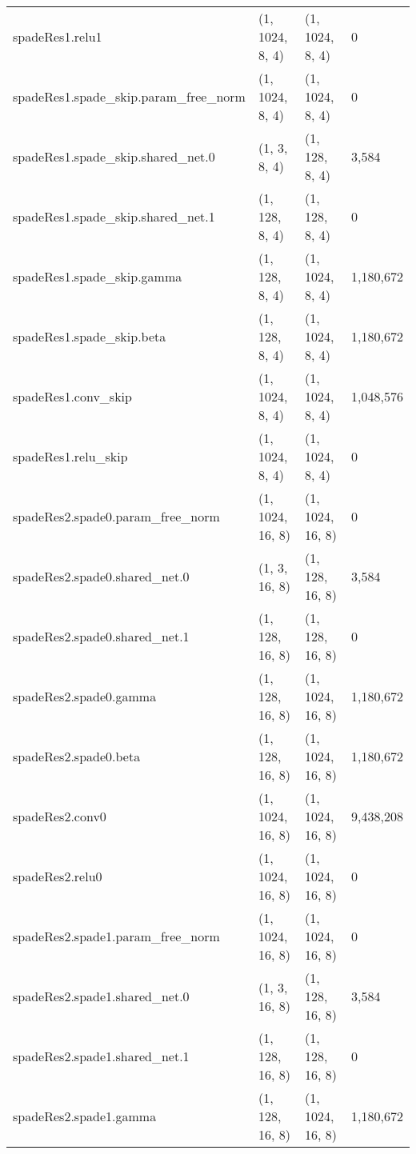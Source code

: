 \begin{longtable}{llll}
                        spadeRes1.relu1 &     (1, 1024, 8, 4) &     (1, 1024, 8, 4) &            0 \\
    spadeRes1.spade\_skip.param\_free\_norm &     (1, 1024, 8, 4) &     (1, 1024, 8, 4) &            0 \\
        spadeRes1.spade\_skip.shared\_net.0 &        (1, 3, 8, 4) &      (1, 128, 8, 4) &        3,584 \\
        spadeRes1.spade\_skip.shared\_net.1 &      (1, 128, 8, 4) &      (1, 128, 8, 4) &            0 \\
            spadeRes1.spade\_skip.gamma &      (1, 128, 8, 4) &     (1, 1024, 8, 4) &    1,180,672 \\
                spadeRes1.spade\_skip.beta &      (1, 128, 8, 4) &     (1, 1024, 8, 4) &    1,180,672 \\
                    spadeRes1.conv\_skip &     (1, 1024, 8, 4) &     (1, 1024, 8, 4) &    1,048,576 \\
                    spadeRes1.relu\_skip &     (1, 1024, 8, 4) &     (1, 1024, 8, 4) &            0 \\
        spadeRes2.spade0.param\_free\_norm &    (1, 1024, 16, 8) &    (1, 1024, 16, 8) &            0 \\
            spadeRes2.spade0.shared\_net.0 &       (1, 3, 16, 8) &     (1, 128, 16, 8) &        3,584 \\
            spadeRes2.spade0.shared\_net.1 &     (1, 128, 16, 8) &     (1, 128, 16, 8) &            0 \\
                spadeRes2.spade0.gamma &     (1, 128, 16, 8) &    (1, 1024, 16, 8) &    1,180,672 \\
                    spadeRes2.spade0.beta &     (1, 128, 16, 8) &    (1, 1024, 16, 8) &    1,180,672 \\
                        spadeRes2.conv0 &    (1, 1024, 16, 8) &    (1, 1024, 16, 8) &    9,438,208 \\
                        spadeRes2.relu0 &    (1, 1024, 16, 8) &    (1, 1024, 16, 8) &            0 \\
        spadeRes2.spade1.param\_free\_norm &    (1, 1024, 16, 8) &    (1, 1024, 16, 8) &            0 \\
            spadeRes2.spade1.shared\_net.0 &       (1, 3, 16, 8) &     (1, 128, 16, 8) &        3,584 \\
            spadeRes2.spade1.shared\_net.1 &     (1, 128, 16, 8) &     (1, 128, 16, 8) &            0 \\
                spadeRes2.spade1.gamma &     (1, 128, 16, 8) &    (1, 1024, 16, 8) &    1,180,672 \\

\end{longtable}
